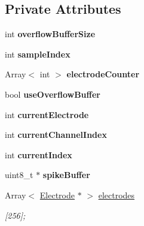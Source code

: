 \subsection*{Private Attributes}
\begin{DoxyCompactItemize}
\item 
\hypertarget{classSpikeDetector_a9bb9fe494706442edbe6f95556c92230}{int {\bfseries overflow\-Buffer\-Size}}\label{classSpikeDetector_a9bb9fe494706442edbe6f95556c92230}

\item 
\hypertarget{classSpikeDetector_a744815ecabf7d3dff9c654a57ee11259}{int {\bfseries sample\-Index}}\label{classSpikeDetector_a744815ecabf7d3dff9c654a57ee11259}

\item 
\hypertarget{classSpikeDetector_a45c1e8ff8c6a8c5f531ca496e41009a9}{Array$<$ int $>$ {\bfseries electrode\-Counter}}\label{classSpikeDetector_a45c1e8ff8c6a8c5f531ca496e41009a9}

\item 
\hypertarget{classSpikeDetector_ab718028e4e8bc0d4fa094d84c38bb50b}{bool {\bfseries use\-Overflow\-Buffer}}\label{classSpikeDetector_ab718028e4e8bc0d4fa094d84c38bb50b}

\item 
\hypertarget{classSpikeDetector_ab0519461dcd76c40bbfc535ebaeb17cf}{int {\bfseries current\-Electrode}}\label{classSpikeDetector_ab0519461dcd76c40bbfc535ebaeb17cf}

\item 
\hypertarget{classSpikeDetector_a0deaa79b22ff4b1516961ee8c1806883}{int {\bfseries current\-Channel\-Index}}\label{classSpikeDetector_a0deaa79b22ff4b1516961ee8c1806883}

\item 
\hypertarget{classSpikeDetector_a06af1d21348b9a71f22b59f36e5c013c}{int {\bfseries current\-Index}}\label{classSpikeDetector_a06af1d21348b9a71f22b59f36e5c013c}

\item 
\hypertarget{classSpikeDetector_a89bb86011a66eebed04fbb48f62768e8}{uint8\-\_\-t $\ast$ {\bfseries spike\-Buffer}}\label{classSpikeDetector_a89bb86011a66eebed04fbb48f62768e8}

\item 
\hypertarget{classSpikeDetector_a40e46503e06199b8366f2f02c064f388}{Array$<$ \hyperlink{structSpikeDetector_1_1Electrode}{Electrode} $\ast$ $>$ \hyperlink{classSpikeDetector_a40e46503e06199b8366f2f02c064f388}{electrodes}}\label{classSpikeDetector_a40e46503e06199b8366f2f02c064f388}

\begin{DoxyCompactList}\small\item\em \mbox{[}256\mbox{]}; \end{DoxyCompactList}\end{DoxyCompactItemize}
